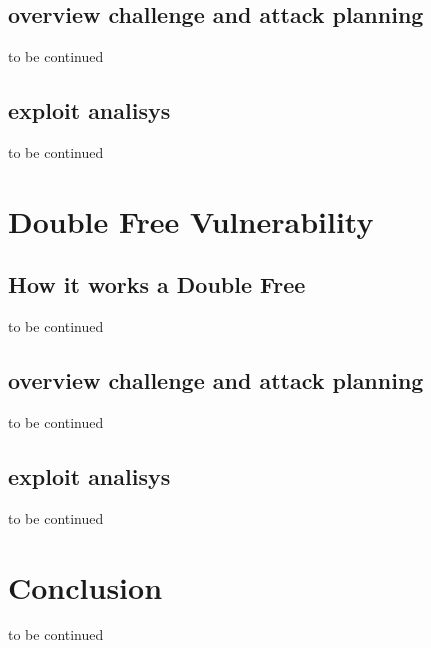 \documentclass{report}
\begin{document}
\section{overview challenge and attack planning}
to be continued
\section{exploit analisys}
to be continued

\chapter{Double Free Vulnerability}
\section{How it works a Double Free}
to be continued
\section{overview challenge and attack planning}
to be continued
\section{exploit analisys}
to be continued

\chapter{Conclusion}
to be continued
\end{document}
